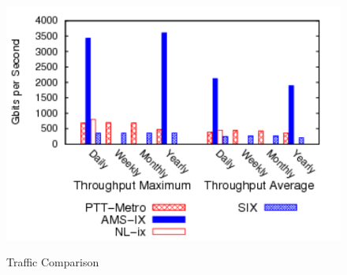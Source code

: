 \documentclass{sig-alternate}
\begin{document}
\begin{figure}[ht]
\centering
{
  \includegraphics[scale=0.7]{figures/Traffic_Comparison.pdf}
  \label{fig:IXP}
}
\caption{Traffic Comparison}
\end{figure}
\end{document}
